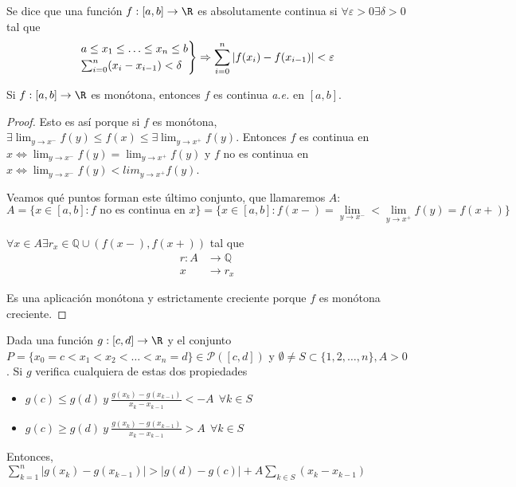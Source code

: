 \begin{ndef}
    Se dice que una función $f : [a, b] \rightarrow \R$ es absolutamente continua si $\forall \varepsilon > 0 \exists \delta > 0$ tal que $$ \begin{rcases}
        a \leq x_1 \leq \hdots \leq x_n \leq b \\
        \sum^{n}_{i=0} (x_i - x_{i-1}) < \delta
    \end{rcases} \Rightarrow  \sum^{n}_{i=0} |f(x_i) - f(x_{i-1})| < \varepsilon$$
\end{ndef}

\begin{nprop}
    \label{elem-lebesgue-botsko-ob1}
     Si $f : [a, b] \rightarrow \R$ es monótona, entonces $f$ es continua \textit{a.e.} en $[a, b]$.
\end{nprop}

\begin{proof}
         Esto es así porque si $f$ es monótona, $\exists \lim_{y \to x^{-}} f(y) \leq f(x) \leq \exists \lim_{y \to x^{+}} f(y)$. Entonces $f$ es continua en $x \Leftrightarrow \lim_{y \to x^{-}} f(y) = \lim_{y \to x^{+}} f(y)$ y $f$ no es continua en $x \Leftrightarrow \lim_{y \to x^{-}} f(y) < lim_{y \to x^{+}} f(y)$.

   Veamos qué puntos forman este último conjunto, que llamaremos $A$: $$A = \{ x \in [a, b] : f \text{ no es continua en } x \} = \{x \in [a, b] : f(x-) = \lim_{y \to x^{-}} < \lim_{y \to x^{+}} f(y) = f(x+) \}$$

   $\forall x \in A \exists r_x \in \mathbb Q \cup (f(x-), f(x+))$  tal que \begin{align*}
       \label{}
       r: A &\longrightarrow \mathbb Q \\
        x & \longrightarrow r_x
   \end{align*}

   Es una aplicación monótona y estrictamente creciente porque $f$ es monótona creciente.

\end{proof}

\begin{lema}
    \label{elem-lebesgue-botsko-ej1}
    Dada una función $g : [c, d] \rightarrow \R$ y el conjunto $P = \{ x_0 = c < x_1 < x_2 < \hdots < x_n = d \} \in \mathcal P([c, d])$ y $\emptyset \neq S \subset \{ 1, 2, \hdots, n \}, A > 0$. Si $g$ verifica cualquiera de estas dos propiedades \begin{itemize}
        \item $\displaystyle g(c) \leq g(d) \ y \ \frac{g(x_k) - g(x_{k-1})}{x_k - x_{k-1}} < - A \ \ \forall k \in S$
        \item $ \displaystyle g(c) \geq g(d) \ y \ \frac{g(x_k) - g(x_{k-1})}{x_k - x_{k-1}} > A \ \ \forall k \in S$
    \end{itemize}
    Entonces, $ \displaystyle \sum^{n}_{k=1} |g(x_k) - g(x_{k-1})| > |g(d) - g(c)| + A \sum^{}_{k \in S} (x_k - x_{k-1})$

\end{lema}

